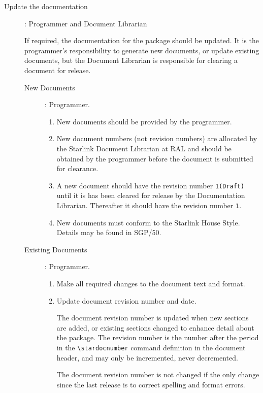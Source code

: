 \documentclass[twoside,11pt]{article}
\newcommand{\stardocnumber}    {51.1}
\newcommand{\xref}[3]{#1}
\begin{document}
\begin{description}
\item[Update the documentation]: Programmer and Document Librarian

If required, the documentation for the package should be updated.  It
is the programmer's responsibility to generate new documents, or
update existing documents, but the Document Librarian is
responsible for clearing a document for release.

\begin{description}

\item [New Documents]:  Programmer.

\begin{enumerate}

\item New documents should be provided by the programmer.

\item New document numbers (not revision numbers) are allocated by the
Starlink Document Librarian at RAL and should be obtained by the
programmer before the document is submitted for clearance.

\item A new document should have the revision number {\tt{1(Draft)}}
until it is has been cleared for release by the Documentation
Librarian.  Thereafter it should have the revision number {\tt{1}}.

\item New documents must conform to the Starlink House Style.  Details
may be found in \xref{SGP/50}{sgp50}{}.

\end{enumerate}

\item [Existing Documents]: Programmer.

\begin{enumerate}

\item Make all required changes to the document text and format.

\item Update document revision number and date.

The document revision number is updated when new sections are
added, or existing sections changed to enhance detail about the
package.  The revision number is the number after the period in the
{\verb+\stardocnumber+} command definition in the document header, and
may only be incremented, never decremented.

The document revision number is not changed if the only change since
the last release is to correct spelling and format errors.


\end{enumerate}
\end{description}
\end{description}
\end{document}
